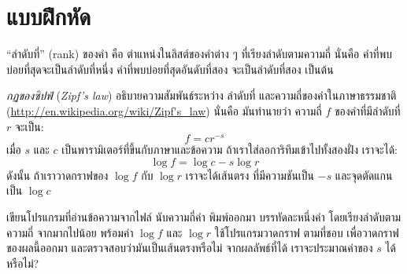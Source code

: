 \section{แบบฝึกหัด}

\begin{exercise}


``ลำดับที่'' (rank) ของคำ คือ ตำแหน่งในลิสต์ของคำต่าง ๆ ที่เรียงลำดับตามความถี่
นั่นคือ คำที่พบบ่อยที่สุดจะเป็นลำดับที่หนึ่ง
คำที่พบบ่อยที่สุดอันดับที่สอง จะเป็นลำดับที่สอง เป็นต้น


\textit{กฏของซิปฟ์} (\textit{Zipf's law}) อธิบายความสัมพันธ์ระหว่าง ลำดับที่
และความถี่ของคำในภาษาธรรมชาติ
(\url{http://en.wikipedia.org/wiki/Zipf's_law})  
นั่นคือ มันทำนายว่า ความถี่ {\scriptsize$f$} ของคำที่มีลำดับที่ {\scriptsize$r$} จะเป็น: 
%
\[ f = c r^{-s} \]
%
%
เมื่อ {\scriptsize$s$} และ {\scriptsize$c$} เป็นพารามิเตอร์ที่ขึ้นกับภาษาและข้อความ
ถ้าเราใส่ลอการิทึมเข้าไปทั้งสองฝั่ง เราจะได้:
%
\[ \log f = \log c - s \log r \]
%
ดังนั้น ถ้าเราวาดกราฟของ {\scriptsize$\log f$} กับ {\scriptsize$\log r$} เราจะได้เส้นตรง 
ที่มีความชันเป็น {\scriptsize$-s$} และจุดตัดแกนเป็น {\scriptsize$\log c$}


เขียนโปรแกรมที่อ่านข้อความจากไฟล์
นับความถี่คำ
พิมพ์ออกมา บรรทัดละหนึ่งคำ โดยเรียงลำดับตามความถี่ จากมากไปน้อย
พร้อมค่า {\scriptsize$\log f$} และ {\scriptsize$\log r$}
ใช้โปรแกรมวาดกราฟ ตามที่ชอบ เพื่อวาดกราฟของผลนี้ออกมา
และตรวจสอบว่ามันเป็นเส้นตรงหรือไม่
จากผลลัพธ์ที่ได้ เราจะประมาณค่าของ {\scriptsize$s$} ได้หรือไม่?


\end{exercise}
